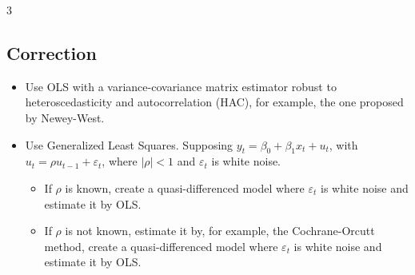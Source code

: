 \documentclass[10pt, a4paper, landscape]{article}
\begin{document}
\begin{multicols}{3}
\subsection*{Correction}

\begin{itemize}[leftmargin=*]
	\item Use OLS with a variance-covariance matrix estimator robust to heteroscedasticity and autocorrelation (HAC), for example, the one proposed by Newey-West.
	\item Use Generalized Least Squares. Supposing \( y_{t} = \beta_{0} + \beta_{1} x_{t} + u_{t} \), with \( u_{t} = \rho u_{t - 1} + \varepsilon_{t} \), where \( \lvert \rho \rvert < 1 \) and \( \varepsilon_{t} \) is white noise.
	\begin{itemize}[leftmargin=*]
		\item If \( \rho \) is known, create a quasi-differenced model where \( \varepsilon_{t} \) is white noise and estimate it by OLS.
		\item If \( \rho \) is not known, estimate it by, for example, the Cochrane-Orcutt method, create a quasi-differenced model where \( \varepsilon_{t} \) is white noise and estimate it by OLS.
	\end{itemize}
\end{itemize}

\end{multicols}
\end{document}
